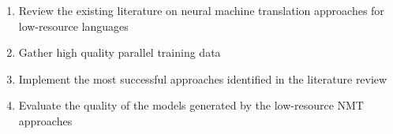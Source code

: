 \begin{enumerate}
  \item Review the existing literature on neural machine translation approaches for low-resource languages
  \item Gather high quality parallel training data
  \item Implement the most successful approaches identified in the literature review
  \item Evaluate the quality of the models generated by the low-resource \acrshort{NMT} approaches
\end{enumerate}
